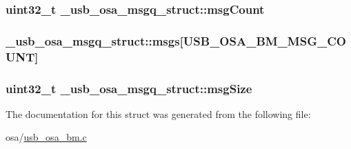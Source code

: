 \hypertarget{struct__usb__osa__msgq__struct_ad3256f6cde77697e233c64bff47ada29}{
\subsubsection[{msg\-Count}]{\setlength{\rightskip}{0pt plus 5cm}uint32\-\_\-t \-\_\-usb\-\_\-osa\-\_\-msgq\-\_\-struct\-::msg\-Count}}\label{struct__usb__osa__msgq__struct_ad3256f6cde77697e233c64bff47ada29}
\hypertarget{struct__usb__osa__msgq__struct_abca5922025c046e9604252a2e5ff3bd7}{
\subsubsection[{msgs}]{ \-\_\-usb\-\_\-osa\-\_\-msgq\-\_\-struct\-::msgs\mbox{[}{\bf U\-S\-B\-\_\-\-O\-S\-A\-\_\-\-B\-M\-\_\-\-M\-S\-G\-\_\-\-C\-O\-U\-N\-T}\mbox{]}}}\label{struct__usb__osa__msgq__struct_abca5922025c046e9604252a2e5ff3bd7}
\hypertarget{struct__usb__osa__msgq__struct_a9ca60eac37ed126c806f087e198eee44}{
\subsubsection[{msg\-Size}]{\setlength{\rightskip}{0pt plus 5cm}uint32\-\_\-t \-\_\-usb\-\_\-osa\-\_\-msgq\-\_\-struct\-::msg\-Size}}\label{struct__usb__osa__msgq__struct_a9ca60eac37ed126c806f087e198eee44}


The documentation for this struct was generated from the following file\-:\begin{DoxyCompactItemize}
\item 
osa/\hyperlink{usb__osa__bm_8c}{usb\-\_\-osa\-\_\-bm.\-c}\end{DoxyCompactItemize}
